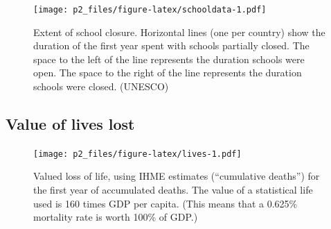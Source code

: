 \documentclass[
]{article}
\begin{document}
\begin{figure}
\centering
\texttt{[image: p2\_files/figure-latex/schooldata-1.pdf]}
\caption{\label{fig:schooldata}Extent of school closure. Horizontal lines (one per country) show the duration of the first year spent with schools partially closed. The space to the left of the line represents the duration schools were open. The space to the right of the line represents the duration schools were closed. (UNESCO)}
\end{figure}

\newpage

\hypertarget{value-of-lives-lost}{%
\subsection{Value of lives lost}\label{value-of-lives-lost}}

\begin{figure}
\centering
\texttt{[image: p2\_files/figure-latex/lives-1.pdf]}
\caption{\label{fig:lives}Valued loss of life, using IHME estimates (``cumulative deaths'') for the first year of accumulated deaths. The value of a statistical life used is 160 times GDP per capita. (This means that a 0.625\% mortality rate is worth 100\% of GDP.)}
\end{figure}
\end{document}
